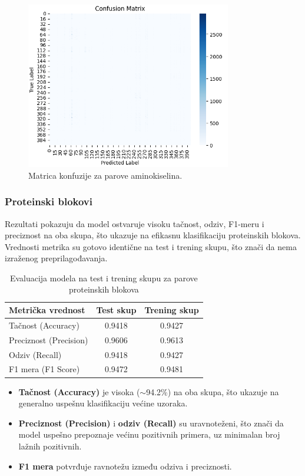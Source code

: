 \documentclass[a4paper,12pt]{article}
\begin{document}
\begin{figure}[htbp]
    \centering
    \includegraphics[width=0.8\textwidth]{./images/conf_mat_aa.png}
    \caption{Matrica konfuzije za parove aminokiselina.}
    \label{Slika:confmataa}
\end{figure}

\subsubsection*{Proteinski blokovi}

Rezultati pokazuju da model ostvaruje visoku tačnost, odziv, F1-meru i preciznost na oba skupa, što ukazuje na efikasnu klasifikaciju proteinskih blokova. Vrednosti metrika su gotovo identične na test i trening skupu, što znači da nema izraženog preprilagođavanja.


\begin{table}[h!]
\centering
\caption{Evaluacija modela na test i trening skupu za parove proteinskih blokova}
\begin{tabular}{l|cc}
\textbf{Metrička vrednost} & \textbf{Test skup} & \textbf{Trening skup} \\
\hline
Tačnost (Accuracy)     & 0.9418 & 0.9427 \\
Preciznost (Precision) & 0.9606 & 0.9613 \\
Odziv (Recall)         & 0.9418 & 0.9427 \\
F1 mera (F1 Score)     & 0.9472 & 0.9481 \\
\end{tabular}
\end{table}


\begin{itemize}
    \item \textbf{Tačnost (Accuracy)} je visoka ($\sim$94.2\%) na oba skupa, što ukazuje na generalno uspešnu klasifikaciju većine uzoraka.
    \item \textbf{Preciznost (Precision)} i \textbf{odziv (Recall)} su uravnoteženi, što znači da model uspešno prepoznaje većinu pozitivnih primera, uz minimalan broj lažnih pozitivnih.
    \item \textbf{F1 mera} potvrđuje ravnotežu između odziva i preciznosti.
\end{itemize}
\end{document}

